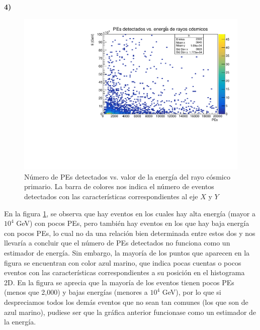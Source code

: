 \documentclass[11pt]{article}
\begin{document}
\textbf{4)}
\begin{figure}[H]
\centering
\includegraphics[width=1\textwidth]{../Figuras/Prob4A.pdf}
\caption{Número de PEs detectados vs. valor de la energía del rayo cósmico primario. La barra de colores nos indica el número de eventos detectados con las características correspondientes al eje $X$ y $Y$}
\label{fig:Prob4}
\end{figure}

En la figura \ref{fig:Prob4}, se observa que hay eventos en los cuales hay alta energía (mayor a $10^4$ GeV) con pocos PEs, pero también hay eventos en los que hay baja energía con pocos PEs, lo cual no da una relación bien determinada entre estos dos y nos llevaría a concluir que el número de PEs detectados no funciona como un estimador de energía. Sin embargo, la mayoría de los puntos que aparecen en la figura se encuentran con color azul marino, que indica pocas cuentas o pocos eventos con las características correspondientes a su posición en el histograma 2D. En la figura se aprecia que la mayoría de los eventos tienen pocos PEs (menos que 2,000) y bajas energías (menores a $10^4$ GeV), por lo que si despreciamos todos los demás eventos que no sean tan comunes (los que son de azul marino), pudiese ser que la gráfica anterior funcionase como un estimador de la energía.
\end{document}
